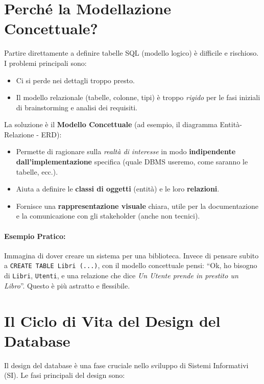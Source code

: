\section{Perché la Modellazione Concettuale?}

Partire direttamente a definire tabelle SQL (modello logico) è difficile e rischioso. I problemi principali sono:
\begin{itemize}
	\item Ci si perde nei dettagli troppo presto.
	\item Il modello relazionale (tabelle, colonne, tipi) è troppo \textit{rigido} per le fasi iniziali di brainstorming e analisi dei requisiti.
\end{itemize}

La soluzione è il \textbf{Modello Concettuale} (ad esempio, il diagramma Entità-Relazione - ERD):
\begin{itemize}
	\item Permette di ragionare sulla \textit{realtà di interesse} in modo \textbf{indipendente dall'implementazione} specifica (quale DBMS useremo, come saranno le tabelle, ecc.).
	\item Aiuta a definire le \textbf{classi di oggetti} (entità) e le loro \textbf{relazioni}.
	\item Fornisce una \textbf{rappresentazione visuale} chiara, utile per la documentazione e la comunicazione con gli stakeholder (anche non tecnici).
\end{itemize}

\paragraph{Esempio Pratico:} Immagina di dover creare un sistema per una biblioteca. Invece di pensare subito a \texttt{CREATE TABLE Libri (...)}, con il modello concettuale pensi: ``Ok, ho bisogno di \texttt{Libri}, \texttt{Utenti}, e una relazione che dice \textit{Un Utente prende in prestito un Libro}''. Questo è più astratto e flessibile.

\section{Il Ciclo di Vita del Design del Database}

Il design del database è una fase cruciale nello sviluppo di Sistemi Informativi (SI). Le fasi principali del design sono:

